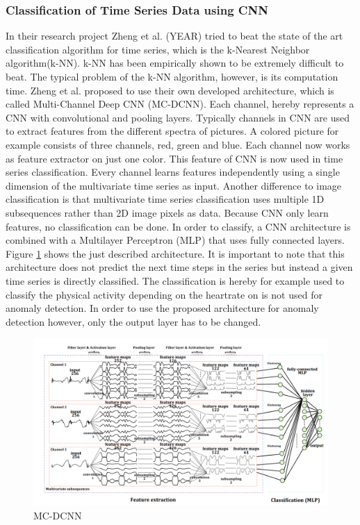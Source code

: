 \subsubsection{Classification of Time Series Data using CNN}
In their research project Zheng et al. (YEAR) tried to beat the state of the art classification algorithm for time series, which is the k-Nearest Neighbor algorithm(k-NN). k-NN has been empirically shown to be extremely difficult to beat. The typical problem of the k-NN algorithm, however, is its computation time. Zheng et al. proposed to use their own developed architecture, which is called Multi-Channel Deep CNN (MC-DCNN). Each channel, hereby represents a CNN with convolutional and pooling layers.
Typically channels in CNN are used to extract features from the different spectra of pictures. A colored picture for example consists of three channels, red, green and blue. Each channel now works as feature extractor on just one color.
This feature of CNN is now used in time series classification. Every channel learns features independently using a single dimension of the multivariate time series as input. Another difference to image classification is that multivariate time series classification uses multiple 1D subsequences rather than 2D image pixels as data. Because CNN only learn features, no classification can be done. In order to classify, a CNN architecture is combined with a Multilayer Perceptron (MLP) that uses fully connected layers. Figure \ref{fig:MC-DCNN} shows the just described architecture. It is important to note that this architecture does not predict the next time steps in the series but instead a given time series is directly classified. The classification is hereby for example used to classify the physical activity depending on the heartrate on is not used for anomaly detection. In order to use the proposed architecture for anomaly detection however, only the output layer has to be changed. 

\begin{figure}[h]
	\centering
	\includegraphics[scale=0.35]{Figures/MC-DCNN}
	\decoRule
	\caption[MC-DCNN]{MC-DCNN \parencite{}}
	\label{fig:MC-DCNN}
\end{figure}

